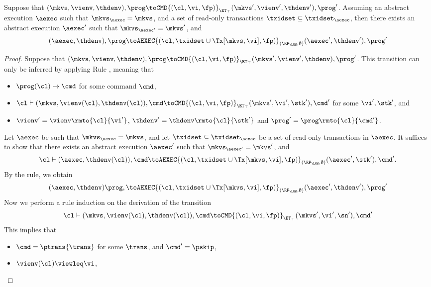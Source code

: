 \begin{proposition}
\label{prop:kv2aexec_transition}
Suppose that $(\mkvs, \vienv, \thdenv), \prog \toCMD{(\cl, \vi, \fp)}_{\ET_{\top}} (\mkvs', 
\vienv', \thdenv'), \prog'$. Assuming an abstract execution $\aexec$ 
such that $\mkvs_{\aexec} = \mkvs$, and a set of read-only transactions $\txidset \subseteq \txidset_{\aexec}$,
then there exists an abstract execution $\aexec'$ such that $\mkvs_{\aexec'} = \mkvs'$, and 
\[
(\aexec, \thdenv), \prog \toAEXEC{(\cl, \txidset \cup \Tx[\mkvs, \vi], \fp)}_{(\RP_{\LWW}, \emptyset)}
(\aexec', \thdenv'), \prog'
\]
\end{proposition}
\begin{proof}
Suppose that $(\mkvs, \vienv, \thdenv), \prog \toCMD{(\cl, \vi, \fp)}_{\ET_{\top}} (\mkvs', \vienv', \thdenv), \prog'$. 
This transition can only be inferred by applying Rule , meaning that 
\begin{itemize}
\item $\prog(\cl) \mapsto \cmd$ for some command $\cmd$, 
\item $\cl \vdash (\mkvs, \vienv(\cl), \thdenv(\cl)), \cmd \toCMD{(\cl, \vi, \fp)}_{\ET_{\top}} (\mkvs', \vi', \stk'), \cmd'$ 
for some $\vi', \stk'$, and 
\item $\vienv' = \vienv\rmto{\cl}{\vi'}$, $\thdenv' = \thdenv\rmto{\cl}{\stk'}$ and $\prog' = \prog\rmto{\cl}{\cmd'}$. 
\end{itemize}
Let $\aexec$ be such that $\mkvs_{\aexec} = \mkvs$, and let $\txidset \subseteq \txidset_{\aexec}$ be a set of read-only transactions in $\aexec$. 
It suffices to show that there exists an abstract execution $\aexec'$ such that 
$\mkvs_{\aexec'} = \mkvs'$, and 
\[
    \cl \vdash (\aexec, \thdenv(\cl)), \cmd \toAEXEC{(\cl, \txidset \cup \Tx[\mkvs, \vi], \fp)}_{(\RP_{\LWW}, \emptyset)} (\aexec', \stk'), \cmd'.
\]
By the  rule, we obtain 
\[ 
    (\aexec, \thdenv) \prog, \toAEXEC{(\cl, \txidset \cup \Tx[\mkvs,\vi], \fp)}_{(\RP_{\LWW}, \emptyset)} (\aexec' ,\thdenv'), \prog'
\]
Now we perform a rule induction on the derivation of the transition 
\[
    \cl \vdash (\mkvs, \vienv(\cl), \thdenv(\cl)), \cmd \toCMD{(\cl, \vi, \fp)}_{\ET_{\top}} (\mkvs', \vi', \sn'), \cmd'
\]
This implies that 
\begin{itemize}
\item $\cmd = \ptrans{\trans}$ for some $\trans$, and $\cmd' = \pskip$,
\item $\vienv(\cl) \viewleq \vi$, 

\end{itemize}
\end{proof}
